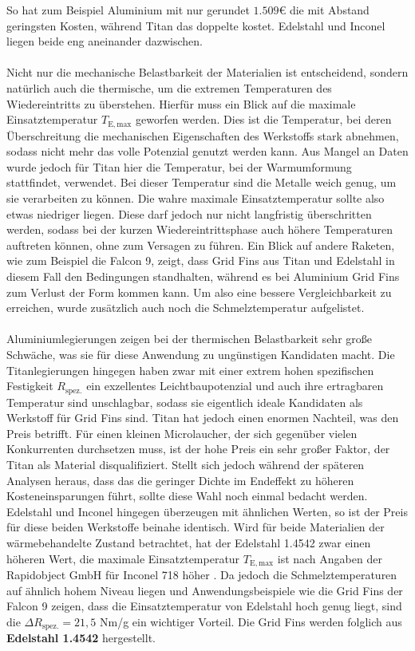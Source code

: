 So hat zum Beispiel Aluminium mit nur gerundet $1.509$€ die mit Abstand geringsten Kosten, während Titan das doppelte kostet. Edelstahl und Inconel liegen beide eng aneinander dazwischen.
\\~\\
Nicht nur die mechanische Belastbarkeit der Materialien ist entscheidend, sondern natürlich auch die thermische, um die extremen Temperaturen des Wiedereintritts zu überstehen. Hierfür muss ein Blick auf die maximale Einsatztemperatur $T_\mathrm{E, max}$ geworfen werden. Dies ist die Temperatur, bei deren Überschreitung die mechanischen Eigenschaften des Werkstoffs stark abnehmen, sodass nicht mehr das volle Potenzial genutzt werden kann. Aus Mangel an Daten wurde jedoch für Titan hier die Temperatur, bei der Warmumformung stattfindet, verwendet. Bei dieser Temperatur sind die Metalle weich genug, um sie verarbeiten zu können. Die wahre maximale Einsatztemperatur sollte also etwas niedriger liegen. Diese darf jedoch nur nicht langfristig überschritten werden, sodass bei der kurzen Wiedereintrittsphase auch höhere Temperaturen auftreten können, ohne zum Versagen zu führen. Ein Blick auf andere Raketen, wie zum Beispiel die Falcon 9, zeigt, dass Grid Fins aus Titan und Edelstahl in diesem Fall den Bedingungen standhalten, während es bei Aluminium Grid Fins zum Verlust der Form kommen kann. Um also eine bessere Vergleichbarkeit zu erreichen, wurde zusätzlich auch noch die Schmelztemperatur aufgelistet.
\\~\\
Aluminiumlegierungen zeigen bei der thermischen Belastbarkeit sehr große Schwäche, was sie für diese Anwendung zu ungünstigen Kandidaten macht. Die Titanlegierungen hingegen haben zwar mit einer extrem hohen spezifischen Festigkeit $R_\mathrm{spez.}$ ein exzellentes Leichtbaupotenzial und auch ihre ertragbaren Temperatur sind unschlagbar, sodass sie eigentlich ideale Kandidaten als Werkstoff für Grid Fins sind. Titan hat jedoch einen enormen Nachteil, was den Preis betrifft. Für einen kleinen Microlaucher, der sich gegenüber vielen Konkurrenten durchsetzen muss, ist der hohe Preis ein sehr großer Faktor, der Titan als Material disqualifiziert. Stellt sich jedoch während der späteren Analysen heraus, dass das die geringer Dichte im Endeffekt zu höheren Kosteneinsparungen führt, sollte diese Wahl noch einmal bedacht werden. Edelstahl und Inconel hingegen überzeugen mit ähnlichen Werten, so ist der Preis für diese beiden Werkstoffe beinahe identisch. Wird für beide Materialien der wärmebehandelte Zustand betrachtet, hat der Edelstahl 1.4542 zwar einen höheren Wert, die maximale Einsatztemperatur $T_\mathrm{E, max}$ ist nach Angaben der Rapidobject GmbH für Inconel 718 höher \cite{preise}. Da jedoch die Schmelztemperaturen auf ähnlich hohem Niveau liegen und Anwendungsbeispiele wie die Grid Fins der Falcon 9 zeigen, dass die Einsatztemperatur von Edelstahl hoch genug liegt, sind die $\Delta R_\mathrm{spez.} = 21,5$ Nm/g ein wichtiger Vorteil. Die Grid Fins werden folglich aus \textbf{Edelstahl 1.4542} hergestellt.

